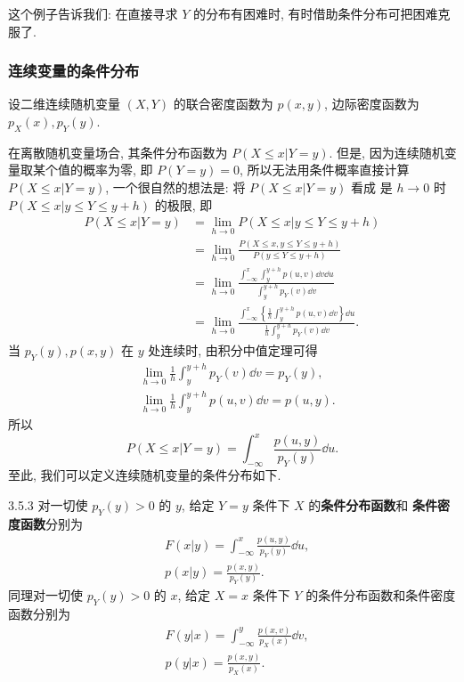 	这个例子告诉我们: 在直接寻求 $Y$ 的分布有困难时, 有时借助条件分布可把困难克服了.

	\subsubsection{连续变量的条件分布}

	设二维连续随机变量 $(X,Y)$ 的联合密度函数为 $p(x,y)$, 边际密度函数为 $p_X(x),p_Y(y)$.

	在离散随机变量场合, 其条件分布函数为 $P(X\leq x|Y=y)$. 但是, 因为连续随机变量取某个值的概率为零, 即 $P(Y=y)=0$,
	所以无法用条件概率直接计算 $P(X\leq x|Y=y)$, 一个很自然的想法是: 将 $P(X\leq x|Y=y)$ 看成
	是 $h\to 0$ 时 $P(X\leq x|y\leq Y\leq y+h)$ 的极限, 即
	\begin{align*}
		P(X \leq  x | Y=y) &=\lim _{h \to 0} P(X \leq  x | y \leq  Y \leq  y+h) \\
		&=\lim _{h \to 0} \frac{P(X \leq  x, y \leq  Y \leq  y+h)}{P(y \leq  Y \leq  y+h)}\\
		&=\lim _{h \to 0} \frac{\int_{-\infty}^{x} \int_{y}^{y+h} p(u, v) \dd v \dd u}{\int_{y}^{y+h} p_{Y}(v) \dd v} \\
		&=\lim _{h \to 0} \frac{\int_{-\infty}^{x} \left\{ \frac{1}{h} \int_{y}^{y+h} p(u, v) \dd v \right\} \dd u}
		{\frac{1}{h} \int_{y}^{y+h} p_{Y}(v) \dd v}.
	\end{align*}
	当 $p_Y(y),p(x,y)$ 在 $y$ 处连续时, 由积分中值定理可得
	\begin{align*}
		&\lim _{h \to 0} \frac{1}{h} \int_{y}^{y+h} p_{Y}(v) \dd v=p_{Y}(y), \\
		&\lim _{h \to 0} \frac{1}{h} \int_{y}^{y+h} p(u, v) \dd v=p(u, y).
	\end{align*}
	所以
	\[
		P(X \leq x | Y=y)=\int_{-\infty}^{x} \frac{p(u, y)}{p_{Y}(y)} \dd u.
	\]
	至此, 我们可以定义连续随机变量的条件分布如下.
	\begin{definition}{}{3.5.3}
		对一切使 $p_Y(y)>0$ 的 $y$, 给定 $Y=y$ 条件下 $X$ 的\textbf{条件分布函数}和
		\textbf{条件密度函数}分别为
		\begin{align}
		 	&F(x | y)=\int_{-\infty}^{x} \frac{p(u, y)}{p_{Y}(y)} \dd u, \label{eq:3.5.5}\\
		 	&p(x | y)=\frac{p(x, y)}{p_{Y}(y)}.	\label{eq:3.5.6}
		\end{align}
		同理对一切使 $p_Y(y)>0$ 的 $x$, 给定 $X=x$ 条件下 $Y$ 的条件分布函数和条件密度函数分别为
		\begin{align}
			&F(y | x)=\int_{-\infty}^{y} \frac{p(x, v)}{p_{X}(x)} \dd v ,\label{eq:3.5.7}\\
		 	&p(y | x)=\frac{p(x, y)}{p_{X}(x)}	\label{eq:3.5.8}.
		\end{align}
	\end{definition}
